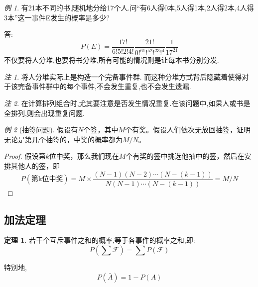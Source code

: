\documentclass[a4paper,11pt]{article}%
\theoremstyle{remark}
\newtheorem*{remark}{注}
\theoremstyle{remark}
\newtheorem*{example}{例}
\theoremstyle{definition}
\newtheorem{theorem}{定理}[section]
\theoremstyle{definition}
\theoremstyle{plain}
\begin{document}
\begin{example}
    有21本不同的书,随机地分给17个人.问``有6人得0本,5人得1本,2人得2本,4人得3本''这一事件E发生的概率是多少?

    答:
    \[P(E)=\frac{17!}{6!5!2!4!}\frac{21!}{0!^61!^52!^23!^4}\frac{1}{17^{21}}\]
    不仅要将人分堆,也要将书分堆,所有可能的情况则是让每本书分别分发.
    \begin{remark}
        将人分堆实际上是构造一个完备事件群.
        而这种分堆方式背后隐藏着使得对于该完备事件群中的每个事件,不会发生重复,也不会发生遗漏.
    \end{remark}
    \begin{remark}
        在计算排列组合时,尤其要注意是否发生情况重复.在该问题中,如果人或书是全排列,则会出现重复问题.
    \end{remark}
\end{example}
\begin{example}[抽签问题]
   假设有$N$个签，其中$M$个有奖。假设人们依次无放回抽签，证明无论是第几个抽签的，中奖的概率都为$M/N$。
   
   \begin{proof}
    假设第$k$位中奖，那么我们现在$M$个有奖的签中挑选他抽中的签，然后在安排其他人的签，即
    \[P(\text{第k位中奖})=M\times\frac{(N-1)(N-2)\cdots(N-(k-1))}{N(N-1)\cdots(N-(k-1))}=M/N\] 
   \end{proof}
\end{example}
\subsection{加法定理}
\begin{theorem}
    若干个互斥事件之和的概率,等于各事件的概率之和,即:
    \[P(\sum \mathcal{F})=\sum P(\mathcal{F})\]
\end{theorem}
特别地,
\[P(\bar{A})=1-P(A)\]
\end{document}
